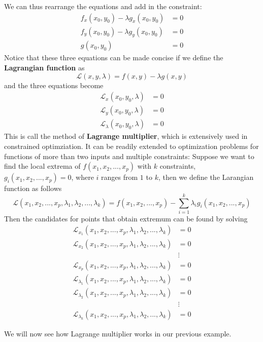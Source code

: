 We can thus rearrange the equations and add in the constraint:
\begin{align*}
    f_x(x_0,y_0) - \lambda g_x(x_0,y_0) &= 0\\
    f_y(x_0,y_0) - \lambda g_y(x_0,y_0) &= 0\\
    g(x_0, y_0) &= 0
\end{align*}
Notice that these three equations can be made concise if we define the \textbf{Lagrangian function} as
\[\mathcal{L}(x,y,\lambda) = f(x,y) - \lambda g(x,y)\]
and the three equations become
\begin{align*}
    \mathcal{L}_x(x_0,y_0,\lambda) &= 0\\
    \mathcal{L}_y(x_0,y_0,\lambda) &= 0\\
    \mathcal{L}_\lambda(x_0,y_0,\lambda) &= 0
\end{align*}
This is call the method of \textbf{Lagrange multiplier}, which is extensively used in constrained optimziation.  It can be readily extended to optimization problems for functions of more than two inputs and multiple constraints: Suppose we want to find the local extrema of $f(x_1, x_2, ..., x_p)$ with $k$ constraints, $g_i(x_1, x_2, ..., x_p) = 0$, where $i$ ranges from $1$ to $k$, then we define the Larangian function as follows
\[\mathcal{L}(x_1, x_2, ..., x_p, \lambda_1, \lambda_2, ..., \lambda_k) = f(x_1, x_2, ..., x_p) - \sum_{i=1}^k \lambda_i g_i(x_1, x_2, ..., x_p)\]
Then the candidates for points that obtain extremum can be found by solving
\begin{align*}
    \mathcal{L}_{x_1}(x_1, x_2, ..., x_p, \lambda_1, \lambda_2, ..., \lambda_k) &= 0\\
    \mathcal{L}_{x_2}(x_1, x_2, ..., x_p, \lambda_1, \lambda_2, ..., \lambda_k) &= 0\\
    &\vdots\\
    \mathcal{L}_{x_p}(x_1, x_2, ..., x_p, \lambda_1, \lambda_2, ..., \lambda_k) &= 0\\
    \mathcal{L}_{\lambda_1}(x_1, x_2, ..., x_p, \lambda_1, \lambda_2, ..., \lambda_k) &= 0\\
    \mathcal{L}_{\lambda_2}(x_1, x_2, ..., x_p, \lambda_1, \lambda_2, ..., \lambda_k) &= 0\\
    &\vdots\\
    \mathcal{L}_{\lambda_k}(x_1, x_2, ..., x_p, \lambda_1, \lambda_2, ..., \lambda_k) &= 0
\end{align*}

We will now see how Lagrange multiplier works in our previous example.

